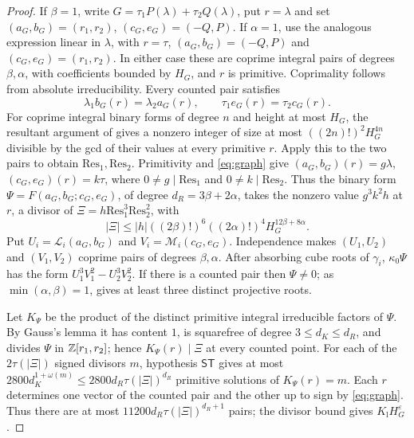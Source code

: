 \documentclass[11pt,reqno]{amsart}
\theoremstyle{definition}
\theoremstyle{remark}
\numberwithin{equation}{section}
\newcommand{\eps}{\varepsilon}\newcommand{\card}{\#}
\newcommand{\ST}{\mathsf{ST}}\newcommand{\CC}{\mathsf{CC}}\newcommand{\GE}{\mathsf{GE}}
\begin{document}
\begin{proof}
If $\beta=1$, write $G=\tau_1P(\lambda)+\tau_2Q(\lambda)$,
put $r=\lambda$ and set $(a_G,b_G)=(r_1,r_2)$,
$(c_G,e_G)=(-Q,P)$. If $\alpha=1$, use the analogous expression
linear in $\lambda$, with $r=\tau$, $(a_G,b_G)=(-Q,P)$ and
$(c_G,e_G)=(r_1,r_2)$. In either case these are coprime integral
pairs of degrees $\beta,\alpha$, with coefficients bounded by $H_G$,
and $r$ is primitive. Coprimality follows from absolute irreducibility.
Every counted pair satisfies
\begin{equation}\label{eq:graph}
 \lambda_1b_G(r)=\lambda_2a_G(r),\qquad
 \tau_1e_G(r)=\tau_2c_G(r).
\end{equation}
For coprime integral binary forms of degree $n$ and height at most
$H_G$, the resultant argument of \cite[proof of Proposition~5.3]{powerful}
gives a nonzero integer of size at most $((2n)!)^2H_G^{4n}$ divisible
by the gcd of their values at every primitive $r$.
Apply this to the two pairs to obtain $\mathrm{Res}_1,\mathrm{Res}_2$.
Primitivity and \eqref{eq:graph} give
$(a_G,b_G)(r)=g\lambda$, $(c_G,e_G)(r)=k\tau$, where
$0\ne g\mid\mathrm{Res}_1$ and $0\ne k\mid\mathrm{Res}_2$.
Thus the binary form $\Psi=F(a_G,b_G;c_G,e_G)$, of degree
$d_R=3\beta+2\alpha$, takes the nonzero value $g^3k^2h$ at $r$,
a divisor of $\Xi=h\mathrm{Res}_1^3\mathrm{Res}_2^2$, with
\[
 |\Xi|\le|h|((2\beta)!)^6((2\alpha)!)^4H_G^{12\beta+8\alpha}.
\]
Put $U_i=\mathcal L_i(a_G,b_G)$ and $V_i=\mathcal M_i(c_G,e_G)$.
Independence makes $(U_1,U_2)$ and $(V_1,V_2)$ coprime pairs of
degrees $\beta,\alpha$. After absorbing cube roots of $\gamma_i$,
$\kappa_0\Psi$ has the form $U_1^3V_1^2-U_2^3V_2^2$.
If there is a counted pair then $\Psi\ne0$; as
$\min(\alpha,\beta)=1$, \cite[Lemma~5.2]{powerful} gives at least
three distinct projective roots.

Let $K_\Psi$ be the product of the distinct primitive integral
irreducible factors of $\Psi$. By Gauss's lemma it has content $1$,
is squarefree of degree $3\le d_K\le d_R$, and divides $\Psi$ in
$\mathbb Z[r_1,r_2]$; hence $K_\Psi(r)\mid\Xi$ at every counted point.
For each of the $2\tau(|\Xi|)$ signed divisors $m$, hypothesis
$\ST$ gives at most
$2800d_K^{1+\omega(m)}\le2800d_R\tau(|\Xi|)^{d_R}$ primitive
solutions of $K_\Psi(r)=m$.
Each $r$ determines one vector of the counted pair and the other up
to sign by \eqref{eq:graph}. Thus there are at most
$11200d_R\tau(|\Xi|)^{d_R+1}$ pairs; the divisor bound gives
$K_{\mathrm l}H_G^\eps$.
\end{proof}
\end{document}
